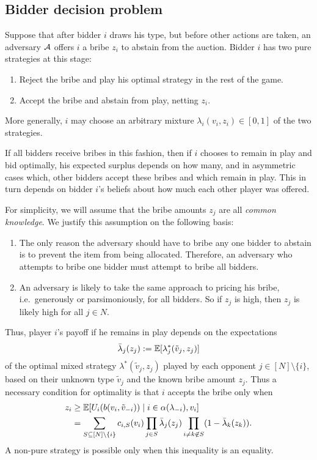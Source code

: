 \newpage
\subsection{Bidder decision problem}

Suppose that after bidder $i$ draws his type, but before other actions are taken, an adversary $\mathcal{A}$ offers $i$ a bribe $z_i$ to abstain from the auction.
%
Bidder $i$ has two pure strategies at this stage:
\begin{enumerate}
  \item Reject the bribe and play his optimal strategy in the rest of the game.
  \item Accept the bribe and abstain from play, netting $z_i$.
\end{enumerate}
%
More generally, $i$ may choose an arbitrary mixture $\lambda_i(v_i,z_i)\in[0,1]$ of the two strategies.

If all bidders receive bribes in this fashion, then if $i$ chooses to remain in play and bid optimally, his expected surplus depends on how many, and in asymmetric cases which, other bidders accept these bribes and which remain in play.
%
This in turn depends on bidder $i$'s beliefs about how much each other player was offered.

For simplicity, we will assume that the bribe amounts $z_j$ are all \emph{common knowledge}.
%
We justify this assumption on the following basis:
%
\begin{enumerate}
  \item 
    The only reason the adversary should have to bribe any one bidder to abstain is to prevent the item from being allocated. 
    Therefore, an adversary who attempts to bribe one bidder must attempt to bribe all bidders.
  
  \item
    An adversary is likely to take the same approach to pricing his bribe, i.e.~generously or parsimoniously, for all bidders.
    So if $z_j$ is high, then $z_j$ is likely high for all $j\in N$.

\end{enumerate}

Thus, player $i$'s payoff if he remains in play depends on the expectations
%
\[
  \bar\lambda_j(z_j) := \mathbb{E}[\lambda_j^*(\tilde{v}_j,z_j)]
\]
%
of the optimal mixed strategy $\lambda^*(\tilde{v}_j,z_j)$ played by each opponent $j\in [N]\setminus\{i\}$, based on their unknown type $\tilde{v}_j$ and the known bribe amount $z_j$.
%
Thus a necessary condition for optimality is that $i$ accepts the bribe only when
\begin{align*}
  z_i &\geq \mathbb{E}[U_i(b(v_i,\tilde{v}_{-i})) \mid i\in \alpha(\lambda_{-i}), v_i] \\
  &= \sum_{S\subseteq [N]\setminus\{i\}} c_{i,S}(v_i) \prod_{j\in S}\bar\lambda_j(z_j) \prod_{i\neq k\not\in S} (1-\bar\lambda_k(z_k)).
\end{align*}
%
A non-pure strategy is possible only when this inequality is an equality.


